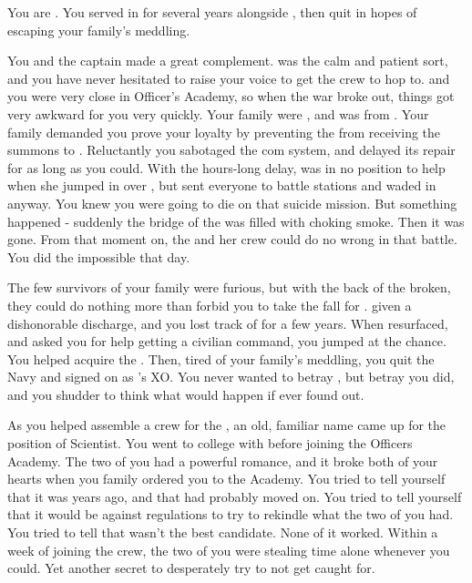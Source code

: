 \documentclass[char]{TMFHope}
\begin{document}
\name{\cXO{}}

You are \cXO{\full}. You served in \pTMN{} for several years alongside \cCap{\full}, then quit in hopes of escaping your family's meddling. 

You and the captain made a great complement. \cCap{} was the calm and patient sort, and you have never hesitated to raise your voice to get the crew to hop to. \cCap{} and you were very close in Officer's Academy, so when the war broke out, things got very awkward for you very quickly. Your family were \pEdge{}, and \cCap{} was from \pHome{}. Your family demanded you prove your loyalty by preventing the \pOld{} from receiving the summons to \pBattle{}. Reluctantly you sabotaged the \pOld{} com system, and delayed its repair for as long as you could. With the hours-long delay, \pOld{} was in no position to help when she jumped in over \pHome{}, but \cCap{} sent everyone to battle stations and waded in anyway. You knew you were going to die on that suicide mission. But something happened - suddenly the bridge of the \pOld{} was filled with choking smoke. Then it was gone. From that moment on, the \pOld{} and her crew could do no wrong in that battle. You did the impossible that day.

The few survivors of your family were furious, but with the back of the \pEdge{} broken, they could do nothing more than forbid you to take the fall for \cCap{}. \cCap{\They} \cCap{\were} given a dishonorable discharge, and you lost track of \cCap{\them} for a few years. When \cCap{\they} resurfaced, and asked you for help getting a civilian command, you jumped at the chance. You helped \cCap{} acquire the \pNew{}. Then, tired of your family's meddling, you quit the Navy and signed on as \cCap{}'s XO. You never wanted to betray \cCap{\them}, but betray you did, and you shudder to think what would happen if \cCap{} ever found out.

As you helped \cCap{} assemble a crew for the \pNew{}, an old, familiar name came up for the position of Scientist. You went to college with \cSci{} before joining the Officers Academy. The two of you had a powerful romance, and it broke both of your hearts when you family ordered you to the Academy. You tried to tell yourself that it was years ago, and that \cSci{} had probably moved on. You tried to tell yourself that it would be against regulations to try to rekindle what the two of you had. You tried to tell \cCap{} that \cSci{} wasn't the best candidate. None of it worked. Within a week of \cSci{} joining the crew, the two of you were stealing time alone whenever you could. Yet another secret to desperately try to not get caught for.
\end{document}
